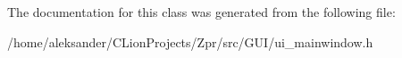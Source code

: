 The documentation for this class was generated from the following file\-:\begin{DoxyCompactItemize}
\item 
/home/aleksander/\-C\-Lion\-Projects/\-Zpr/src/\-G\-U\-I/ui\-\_\-mainwindow.\-h\end{DoxyCompactItemize}
